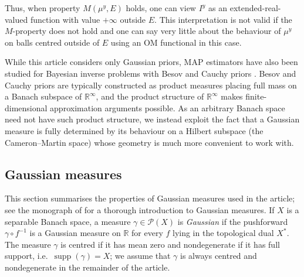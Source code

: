 \documentclass[11pt]{article}
\newcommand*{\prob}[1]{\mathscr{P}(#1)}
\newcommand*{\Reals}{\mathbb{R}}
\DeclareMathOperator*{\supp}{supp}
\theoremstyle{plain}
\theoremstyle{definition}
\numberwithin{equation}{section}
\numberwithin{figure}{section}
\numberwithin{table}{section}
\begin{document}
Thus, when property $M(\mu^y, E)$ holds, one can view $I^y$ as an extended-real-valued function with value $+\infty$ outside $E$.
This interpretation is not valid if the $M$-property does not hold and one can say very little about the behaviour of $\mu^y$ on balls centred outside of $E$ using an OM functional in this case.

While this article considers only Gaussian priors, MAP estimators have also been studied for Bayesian inverse problems with Besov and Cauchy priors \citep{AgapiouBurgerDashtiHelin2018,AyanbayevKlebanovLieSullivan2022b}.
Besov and Cauchy priors are typically constructed as product measures placing full mass on a Banach subspace of $\Reals^\infty$, and the product structure of $\Reals^\infty$ makes finite-dimensional approximation arguments possible.
As an arbitrary Banach space need not have such product structure, we instead exploit the fact that a Gaussian measure is fully determined by its behaviour on a Hilbert subspace (the Cameron--Martin space) whose geometry is much more convenient to work with.

\subsection{Gaussian measures}
This section summarises the properties of Gaussian measures used in the article;
see the monograph of \citet{Bogachev1998} for a thorough introduction to Gaussian measures.
If $X$ is a separable Banach space, a measure $\gamma \in \prob{X}$ is \emph{Gaussian} if the pushforward $\gamma \circ f^{-1}$ is a Gaussian measure on $\Reals$ for every $f$ lying in the topological dual $X^{\ast}$.
The measure $\gamma$ is centred if it has mean zero and nondegenerate if it has full support, i.e.\ $\supp(\gamma) = X$;
we assume that $\gamma$ is always centred and nondegenerate in the remainder of the article.
\end{document}
